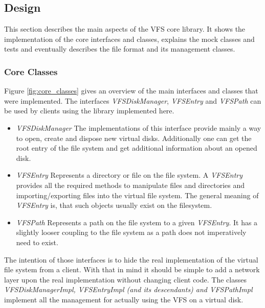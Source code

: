 \subsection{Design}
This section describes the main aspects of the VFS core library. It shows the
implementation of the core interfaces and classes, explains the mock classes and
tests and eventually describes the file format and its management classes.

\subsubsection{Core Classes}\label{sec:coreClasses}
Figure \ref{fig:core_classes} gives an overview of the main interfaces and
classes that were implemented. The interfaces \textit{VFSDiskManager},
\textit{VFSEntry} and \textit{VFSPath} can be used by clients using the library
implemented here.
\begin{itemize}
\item{\textit{VFSDiskManager}} The implementations of this interface provide
mainly a way to open, create and dispose new virtual disks. Additionally one can
get the root entry of the file system and get additional information about an
opened disk.
\item{\textit{VFSEntry}} Represents a directory or file on the file system. A
\textit{VFSEntry} provides all the required methods to manipulate files and
directories and importing/exporting files into the virtual file system. The
general meaning of \textit{VFSEntry} is, that such objects usually exist on the
filesystem.
\item {\textit{VFSPath}} Represents a path on the file system to a given
\textit{VFSEntry}. It has a slightly looser coupling to the file system as a
path does not imperatively need to exist.
\end{itemize}

The intention of those interfaces is to hide the real implementation of the
virtual file system from a client. With that in mind it should be simple to add
a network layer upon the real implementation without changing client code. The
classes \textit{VFSDiskManagerImpl, VFSEntryImpl (and its descendants) and
VFSPathImpl} implement all the management for actually using the VFS on a virtual disk.

